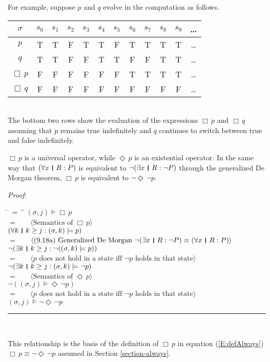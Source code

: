 \documentclass[12pt, fleqn, leqno]{article}
\newcommand{\lgap}{2pt}                             %
\newcommand{\lllgap}{12pt}                          %
\newcommand{\mymathindent}{24pt}                    %
\newcommand{\Event}{\Diamond\,}
\newcommand{\Always}{\Box\,}
\newcommand{\myqed}{\rule[-.23ex]{1.2ex}{2.0ex}}
\newcommand{\myqedtab}{\hspace{384pt}}              %
\newcommand{\thedr}{\rule[-.25ex]{.32mm}{1.75ex}}   %
\newcommand{\dr}{\;\,\thedr\,\;}                    %
\newcommand{\rb}{:}                                 %
\newcommand{\all}{\forall}                          %
\newcommand{\ext}{\exists}                          %
\newcommand{\Gll} {\langle}                         %
\newcommand{\Ggg} {\rangle}                         %
\newcommand{\Hint}[1]     {\ \ \ $\Gll              \mbox{#1} \Ggg$ }   %
\begin{document}
For example, suppose $p$ and $q$ evolve in the computation as follows.\\[\lllgap]
\begin{tabular}{c|ccccccccccc}
  $\sigma$       & $s_0$ & $s_1$ & $s_2$ & $s_3$ & $s_4$ & $s_5$ & $s_6$ & $s_7$ & $s_8$& $s_9$  & \dots \\
  \hline
  $p$            & T     & T     & F     & T     & T     & F     & T     & T     & T     & T     &  \dots\\
  $q$            & T     & T     & F     & F     & T     & T     & F     & F     & T     & T     &  \dots\\
  $\Always p$    & F     & F     & F     & F     & F     & F     & T     & T     & T     & T     &  \dots\\
  $\Always q$    & F     & F     & F     & F     & F     & F     & F     & F     & F     & F     &  \dots\\
\end{tabular}\\[\lllgap]
The bottom two rows show the evaluation of the expressions $\Always p$ and $\Always q$
assuming that $p$ remains true indefinitely and $q$ continues to switch between true and false indefinitely.

$\Always p$ is a universal operator, while $\Event p$ is an existential operator.
In the same way that $(\all x\dr R\rb P)$ is equivalent to $\neg (\ext x\dr R\rb \neg P)$ through the generalized De Morgan theorem, $\Always p$ is equivalent to $\neg\Event\neg p$.

\emph{Proof}:
\begin{tabbing}
\hspace{\mymathindent} \= $= \;$ \= \myqedtab \= \kill
	\> \>   $(\sigma, j) \models \Always p$\\[\lgap]
	\> $=$  \>  \Hint{Semantics of $\Always p$}\\[\lgap]
	\> \>   $(\all k \dr k \ge j \rb (\sigma,k) \models p)$\\[\lgap]
	\> $=$  \>  \Hint{(9.18a) Generalized De Morgan $\neg (\ext x\dr R\rb \neg P)\equiv (\all x\dr R\rb P)$}\\[\lgap]
	\> \>   $\neg (\ext k \dr k \ge j \rb \neg((\sigma,k) \models p))$\\[\lgap]
	\> $=$  \>  \Hint{$p$ does not hold in a state iff $\neg p$ holds in that state}\\[\lgap]
	\> \>   $\neg (\ext k \dr k \ge j \rb (\sigma,k) \models \neg p)$\\[\lgap]
	\> $=$  \>  \Hint{Semantics of $\Event p$}\\[\lgap]
	\> \>   $\neg ((\sigma, j) \models \Event \neg p)$\\[\lgap]
	\> $=$  \>  \Hint{$p$ does not hold in a state iff $\neg p$ holds in that state}\\[\lgap]
	\> \>   $(\sigma, j) \models \neg \Event \neg p$ \quad \myqed\\
\end{tabbing}
This relationship is the basis of the definition of $\Always p$ in equation (\ref{E:defAlways})
$\Always p \equiv \neg\Event\neg p$ assumed in Section \ref{section-always}.
\end{document}
